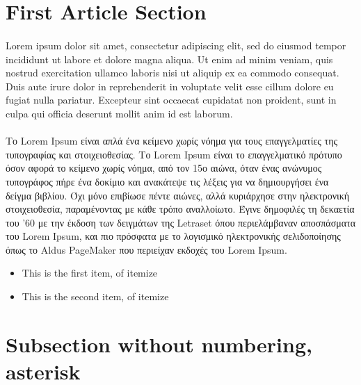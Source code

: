 \documentclass[a4paper]{article}
\begin{document}


\tableofcontents

\listoffigures

\listoflistings

\listoftables

\newpage

\section{First Article Section}
\paragraph{}Lorem ipsum dolor sit amet, consectetur adipiscing elit, sed do eiusmod tempor incididunt ut labore et dolore magna aliqua.
Ut enim ad minim veniam, quis nostrud exercitation ullamco laboris nisi ut aliquip ex ea commodo consequat. Duis aute irure dolor in
reprehenderit in voluptate velit esse cillum dolore eu fugiat nulla pariatur. Excepteur sint occaecat cupidatat non proident, sunt in
culpa qui officia deserunt mollit anim id est laborum.
\paragraph{}Το Lorem Ipsum είναι απλά ένα κείμενο χωρίς νόημα για τους επαγγελματίες της τυπογραφίας και στοιχειοθεσίας.
Το Lorem Ipsum είναι το επαγγελματικό πρότυπο όσον αφορά το κείμενο χωρίς νόημα, από τον 15ο αιώνα, όταν ένας ανώνυμος
τυπογράφος πήρε ένα δοκίμιο και ανακάτεψε τις λέξεις για να δημιουργήσει ένα δείγμα βιβλίου. Όχι μόνο επιβίωσε πέντε αιώνες,
αλλά κυριάρχησε στην ηλεκτρονική στοιχειοθεσία, παραμένοντας με κάθε τρόπο αναλλοίωτο. Έγινε δημοφιλές τη δεκαετία του '60 με την
έκδοση των δειγμάτων της Letraset όπου περιελάμβαναν αποσπάσματα του Lorem Ipsum, και πιο πρόσφατα με το λογισμικό ηλεκτρονικής
σελιδοποίησης όπως το Aldus PageMaker που περιείχαν εκδοχές του Lorem Ipsum.

\begin{itemize}
\item This is the first item, of itemize
\item This is the second item, of itemize
\end{itemize}

\section*{Subsection without numbering, asterisk}
\end{document}
